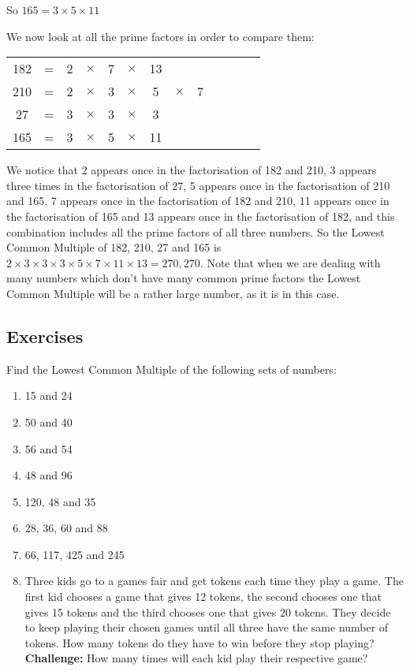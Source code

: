 \documentclass[11pt, oneside]{article}
\theoremstyle{definition}
\begin{document}
So $165 = 3\times 5 \times 11$

We now look at all the prime factors in order to compare them:

\begin{tabular}{c c c c c c c c c c c c c}
182 & = & 2 & $\times$ & 7 & $\times$ & 13 &  &  &  &  &  &  \\
210 & = & 2 & $\times$ & 3 & $\times$ & 5 & $\times$ & 7 &  &  &  & \\
27 & = & 3 & $\times$ & 3 & $\times$ & 3 &  &  &  &  &  & \\
165 & = & 3 & $\times$ & 5 & $\times$ & 11 &  &  &  &  &  & 
\end{tabular}

We notice that 2 appears once in the factorisation of 182 and 210, 3 appears three times in the factorisation of 27, 5 appears once in the factorisation of 210 and 165, 7 appears once in the factorisation of 182 and 210, 11 appears once in the factorisation of 165 and 13 appears once in the factorisation of 182, and this combination includes all the prime factors of all three numbers. So the Lowest Common Multiple of 182, 210, 27 and 165 is $2\times 3 \times 3 \times 3 \times 5 \times 7 \times 11 \times 13 = 270,270$. Note that when we are dealing with many numbers which don't have many common prime factors the Lowest Common Multiple will be a rather large number, as it is in this case.

\subsection{Exercises}
Find the Lowest Common Multiple of the following sets of numbers:
\begin{enumerate}
\item 15 and 24
\item 50 and 40
\item 56 and 54
\item 48 and 96
\item 120, 48 and 35
\item 28, 36, 60 and 88
\item 66, 117, 425 and 245
\bigbreak
\item Three kids go to a games fair and get tokens each time they play a game. The first kid chooses a game that gives 12 tokens, the second chooses one that gives 15 tokens and the third chooses one that gives 20 tokens. They decide to keep playing their chosen games until all three have the same number of tokens. How many tokens do they have to win before they stop playing? {\bf Challenge:} How many times will each kid play their respective game?
\end{enumerate}
\end{document}
